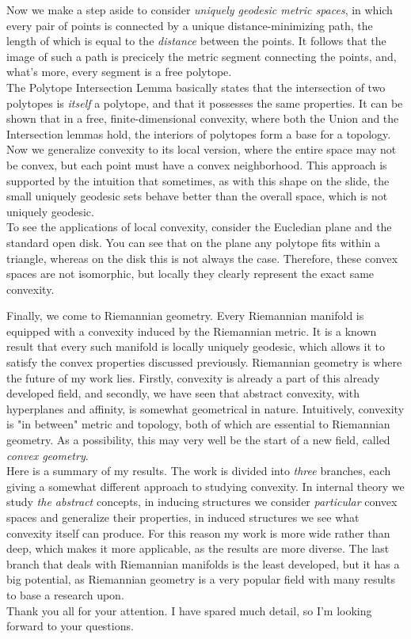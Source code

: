 \documentclass[12pt]{article}
\begin{document}
Now we make a step aside to consider \textit{uniquely geodesic metric spaces}, in which every pair of points is connected by a unique distance-minimizing path, the length of which is equal to the \textit{distance} between the points. It follows that the image of such a path is precicely the metric segment connecting the points, and, what's more, every segment is a free polytope.\\


The Polytope Intersection Lemma basically states that the intersection of two polytopes is \textit{itself} a polytope, and that it possesses the same properties. It can be shown that in a free, finite-dimensional convexity, where both the Union and the Intersection lemmas hold, the interiors of polytopes form a base for a topology.\\

Now we generalize convexity to its local version, where the entire space may not be convex, but each point must have a convex neighborhood. This approach is supported by the intuition that sometimes, as with this shape on the slide, the small uniquely geodesic sets behave better than the overall space, which is not uniquely geodesic.\\

To see the applications of local convexity, consider the Eucledian plane and the standard open disk. You can see that on the plane any polytope fits within a triangle, whereas on the disk this is not always the case. Therefore, these convex spaces are not isomorphic, but locally they clearly represent the exact same convexity.\\

\newpage

Finally, we come to Riemannian geometry. Every Riemannian manifold is equipped with a convexity induced by the Riemannian metric. It is a known result that every such manifold is locally uniquely geodesic, which allows it to satisfy the convex properties discussed previously. Riemannian geometry is where the future of my work lies. Firstly, convexity is already a part of this already developed field, and secondly, we have seen that abstract convexity, with hyperplanes and affinity, is somewhat geometrical in nature. Intuitively, convexity is "in between" metric and topology, both of which are essential to Riemannian geometry. As a possibility, this may very well be the start of a new field, called \textit{convex geometry}.\\

Here is a summary of my results. The work is divided into \textit{three} branches, each giving a somewhat different approach to studying convexity. In internal theory we study \textit{the abstract} concepts, in inducing structures we consider \textit{particular} convex spaces and generalize their properties, in induced structures we see what convexity itself can produce. For this reason my work is more wide rather than deep, which makes it more applicable, as the results are more diverse. The last branch that deals with Riemannian manifolds is the least developed, but it has a big potential, as Riemannian geometry is a very popular field with many results to base a research upon.\\

Thank you all for your attention. I have spared much detail, so I'm looking forward to your questions.
\end{document}

